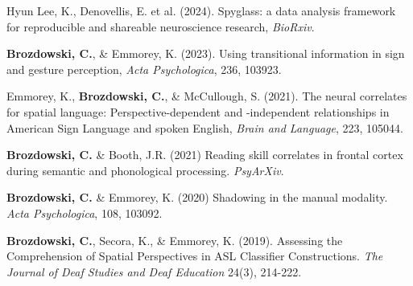 

\par
\begin{cvparagraphlist}
  Hyun Lee, K., Denovellis, E. et al. (2024). Spyglass: a data analysis framework for reproducible and shareable neuroscience research, \textit{BioRxiv}. \par
  \textbf{Brozdowski, C.}, \& Emmorey, K. (2023). Using transitional information in sign and gesture perception, \textit{Acta Psychologica}, 236, 103923. \par
  Emmorey, K., \textbf{Brozdowski, C.}, \& McCullough, S. (2021). The neural correlates for spatial language: Perspective-dependent and -independent relationships in American Sign Language and spoken English, \textit{Brain and Language}, 223, 105044. \par 
  \textbf{Brozdowski, C.} \& Booth, J.R. (2021) Reading skill correlates in frontal cortex during semantic and phonological processing. \textit{PsyArXiv}. \par 
  \textbf{Brozdowski, C.} \& Emmorey, K. (2020) Shadowing in the manual modality. \textit{Acta Psychologica}, 108, 103092. \par 
  \textbf{Brozdowski, C.}, Secora, K., \& Emmorey, K. (2019). Assessing the Comprehension of Spatial Perspectives in ASL Classifier Constructions. \textit{The Journal of Deaf Studies and Deaf Education} 24(3), 214-222. \par 
\end{cvparagraphlist}

